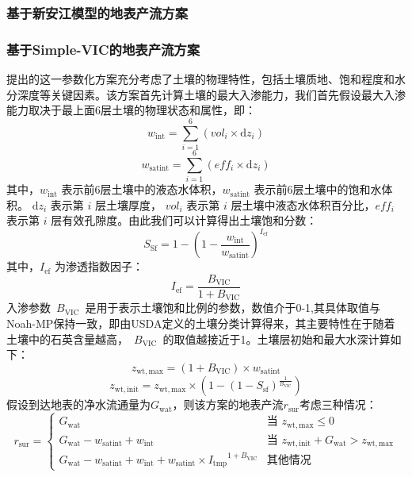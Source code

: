 \subsubsection{基于新安江模型的地表产流方案}

\subsubsection{基于Simple-VIC的地表产流方案}
\cite{Liang2003Anew}提出的这一参数化方案充分考虑了土壤的物理特性，包括土壤质地、饱和程度和水分深度等关键因素。该方案首先计算土壤的最大入渗能力，我们首先假设最大入渗能力取决于最上面6层土壤的物理状态和属性，即：
\begin{equation}
w_{\mathrm{{int}}} = \sum_{i=1}^{6}\left( {vol}_{i} \times {{\mathrm {d}} z}_{i} \right)
\end{equation}
\begin{equation}
w_{\mathrm{{satint}}} = \sum_{i=1}^{6}\left( {eff}_{i} \times {{\mathrm {d}} z}_{i} \right)
\end{equation}
其中，$w_{\mathrm{{int}}}$ 表示前6层土壤中的液态水体积，$w_{\mathrm{{satint}}}$ 表示前6层土壤中的饱和水体积。 ${{\mathrm {d}} z}_{i}$ 表示第 $i$ 层土壤厚度， ${vol}_{i}$ 表示第 $i$ 层土壤中液态水体积百分比，${eff}_{i}$ 表示第 $i$ 层有效孔隙度。由此我们可以计算得出土壤饱和分数：
\begin{equation}
{S}_{\mathrm{{Sf}}} = 1 - \left( 1 - \frac{w_{\mathrm{{int}}}}{w_{\mathrm{{satint}}}} \right)^{{I}_{\mathrm{{ef}}}}
\end{equation}
其中，${I}_{\mathrm{{ef}}}$ 为渗透指数因子：
\begin{equation}
{I}_{\mathrm{{ef}}} = \frac{B_{\mathrm{{VIC}}}}{1 + B_{\text{VIC}}}
\end{equation}
入渗参数~$B_{\mathrm{{VIC}}}$~是用于表示土壤饱和比例的参数，数值介于0-1,其具体取值与Noah-MP保持一致，即由USDA定义的土壤分类计算得来，其主要特性在于随着土壤中的石英含量越高，~$B_{\mathrm{VIC}}$~的取值越接近于1。土壤层初始和最大水深计算如下：
\begin{equation}
z_{\mathrm{wt,max}}= \left( 1 + B_{\mathrm{{VIC}}} \right) \times w_{\mathrm{{satint}}}
\end{equation}
\begin{equation}
z_{\mathrm{wt,init}} = z_{\mathrm{wt,max}} \times \left( 1 - \left( 1 - {S}_{\mathrm{{sf}}} \right)^{\frac{1}{B_{\mathrm{{VIC}}}}} \right)
\end{equation}
假设到达地表的净水流通量为$G_{\mathrm{wat}}$，则该方案的地表产流$r_{\mathrm{sur}}$考虑三种情况：
\begin{equation}
r_{\mathrm{sur}} = 
\begin{cases}
G_{\mathrm{wat}} & \text{当 } z_{\mathrm{wt,max}} \leq 0 \\
G_{\mathrm{wat}} - w_{\mathrm{{satint}}} + w_{\mathrm{{int}}} & \text{当 } z_{\mathrm{wt,init}} + G_{\mathrm{wat}} > z_{\mathrm{wt,max}} \\
G_{\mathrm{wat}}- w_{\mathrm{{satint}}} + w_{\mathrm{{int}}} + w_{\mathrm{{satint}}} \times {{I}_{\mathrm{{tmp}}}}^{1 + B_{\mathrm{{VIC}}}} & \text{其他情况}
\end{cases}
\end{equation}
